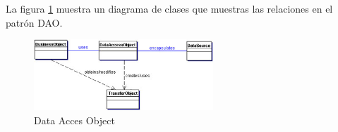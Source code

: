 %
La figura \ref{fig:dao-structure} muestra un diagrama de clases que muestras las relaciones en el patrón DAO.  

\begin{figure}[h]
  \centering
    \includegraphics[width=0.6\textwidth]{figuras/dao-structure.jpg}
  \caption{Data Acces Object}
  \label{fig:dao-structure}
\end{figure}

